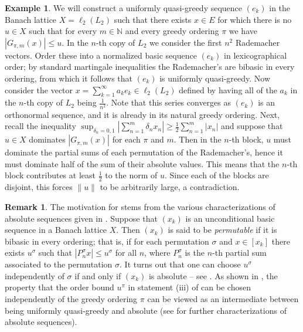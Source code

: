 \documentclass[12pt,leqno]{amsart}
\numberwithin{equation}{section}
\theoremstyle{definition}
\newtheorem{remark}[theorem]{Remark}
\newtheorem{example}[theorem]{Example}
\def\N{{\mathbb N}}
\begin{document}
\begin{example} \label{Not uniform} We will construct a uniformly quasi-greedy sequence $(e_k)$ in the Banach lattice $X=\ell_2(L_2)$ such that there exists $x\in E$ for which there is no $u\in X$ such that for every $m\in\N$ and every greedy ordering $\pi$ we have $|G_{\pi,m}(x)|\leq u$.  In the $n$-th copy of $L_2$ we consider the first $n^2$ Rademacher vectors. Order these into a normalized  basic sequence $(e_k)$ in lexicographical order; by standard martingale inequalities the Rademacher's are bibasic in every ordering, from which it follows that $(e_k)$ is uniformly quasi-greedy. Now  consider the vector $x=\sum_{k=1}^\infty a_ke_k\in \ell_2(L_2)$ defined by having all of the $a_k$ in the $n$-th copy of $L_2$ being $\frac{1}{n^2}$. Note that this series converges as $(e_k)$ is an orthonormal sequence, and it is already in its natural greedy ordering. 
Next, recall the inequality $\sup_{\delta_n=0,1}|\sum_{n=1}^m\delta_nx_n|\geq \frac{1}{2}\sum_{n=1}^m|x_n|$ and suppose that $u\in X$ dominates $|G_{\pi,m}(x)|$ for each $\pi$ and $m$. Then in the $n$-th block, $u$ must dominate the partial sums of each permutation of the Rademacher's, hence it must dominate half of the sum of their absolute values. This means that the $n$-th block contributes at least $\frac{1}{2}$ to the norm of $u$. Since each of the blocks are disjoint, this forces $\|u\|$ to be arbitrarily large, a contradiction.
\end{example}
\begin{remark}
The motivation for  stems from the various characterizations of absolute sequences given in \cite{TT19}. Suppose that $(x_k)$ is an unconditional basic sequence in a Banach lattice $X$. Then $(x_k)$ is said to be \emph{permutable} if it is bibasic in every ordering; that is, if for each permutation $\sigma$ and $x\in [x_k]$ there exists $u^\sigma$ such that $|P^\sigma_nx|\leq u^\sigma$ for all $n$, where $P^\sigma_n$ is the $n$-th partial sum associated to the permutation $\sigma$. It turns out that one can choose $u^\sigma$ independently of $\sigma$ if and only if $(x_k)$ is absolute -- see \cite[Proposition 7.5]{TT19}.  As shown in , the property that the order bound $u^\pi$ in statement (iii) of  can be chosen independently of the greedy ordering $\pi$ can be viewed as an intermediate between being uniformly quasi-greedy and absolute (see \cite[Theorem 7.2]{TT19} for further characterizations of absolute sequences). 
\end{remark}
\end{document}
